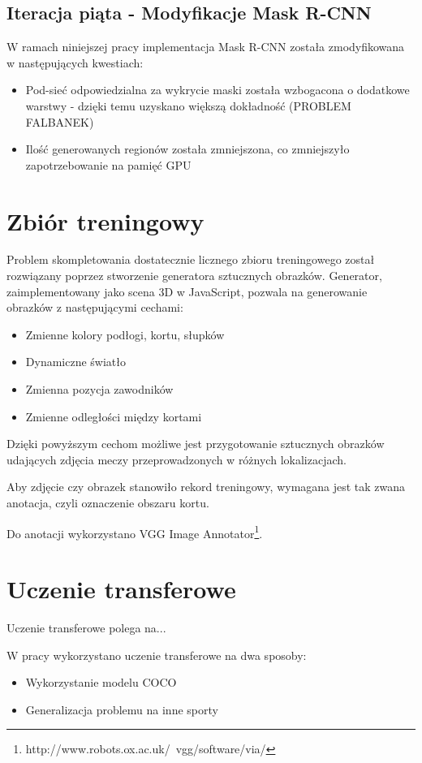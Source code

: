 \subsection{Iteracja piąta - Modyfikacje Mask R-CNN}

W ramach niniejszej pracy implementacja Mask R-CNN została zmodyfikowana w następujących kwestiach:

\begin{itemize}
	\item Pod-sieć odpowiedzialna za wykrycie maski została wzbogacona o dodatkowe warstwy - dzięki temu uzyskano większą dokładność (PROBLEM FALBANEK)
	\item Ilość generowanych regionów została zmniejszona, co zmniejszyło zapotrzebowanie na pamięć GPU
\end{itemize}

\section{Zbiór treningowy}

Problem skompletowania dostatecznie licznego zbioru treningowego został rozwiązany poprzez stworzenie generatora sztucznych obrazków. Generator, zaimplementowany jako scena 3D w JavaScript, pozwala na generowanie obrazków z następującymi cechami:

\begin{itemize}
	\item Zmienne kolory podłogi, kortu, słupków
	\item Dynamiczne światło
	\item Zmienna pozycja zawodników
	\item Zmienne odległości między kortami
\end{itemize}

Dzięki powyższym cechom możliwe jest przygotowanie sztucznych obrazków udających zdjęcia meczy przeprowadzonych w różnych lokalizacjach.

Aby zdjęcie czy obrazek stanowiło rekord treningowy, wymagana jest tak zwana anotacja, czyli oznaczenie obszaru kortu.

Do anotacji wykorzystano VGG Image Annotator\footnote{http://www.robots.ox.ac.uk/~vgg/software/via/}.

\section{Uczenie transferowe}

Uczenie transferowe polega na...

W pracy wykorzystano uczenie transferowe na dwa sposoby:

\begin{itemize}
	\item Wykorzystanie modelu COCO
	\item Generalizacja problemu na inne sporty
\end{itemize}
